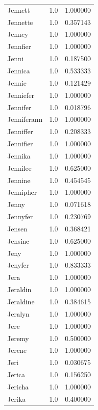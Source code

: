 \documentclass[
  letterpaper,
  DIV=11,
  numbers=noendperiod]{scrreprt}
\begin{document}
\begin{tabular}{lrr}
Jennett         &   1.0 &   1.000000 \\
Jennette        &   1.0 &   0.357143 \\
Jenney          &   1.0 &   1.000000 \\
Jennfier        &   1.0 &   1.000000 \\
Jenni           &   1.0 &   0.187500 \\
Jennica         &   1.0 &   0.533333 \\
Jennie          &   1.0 &   0.121429 \\
Jenniefer       &   1.0 &   1.000000 \\
Jennifer        &   1.0 &   0.018796 \\
Jenniferann     &   1.0 &   1.000000 \\
Jenniffer       &   1.0 &   0.208333 \\
Jennifier       &   1.0 &   1.000000 \\
Jennika         &   1.0 &   1.000000 \\
Jennilee        &   1.0 &   0.625000 \\
Jennine         &   1.0 &   0.454545 \\
Jennipher       &   1.0 &   1.000000 \\
Jenny           &   1.0 &   0.071618 \\
Jennyfer        &   1.0 &   0.230769 \\
Jensen          &   1.0 &   0.368421 \\
Jensine         &   1.0 &   0.625000 \\
Jeny            &   1.0 &   1.000000 \\
Jenyfer         &   1.0 &   0.833333 \\
Jera            &   1.0 &   1.000000 \\
Jeraldin        &   1.0 &   1.000000 \\
Jeraldine       &   1.0 &   0.384615 \\
Jeralyn         &   1.0 &   1.000000 \\
Jere            &   1.0 &   1.000000 \\
Jeremy          &   1.0 &   0.500000 \\
Jerene          &   1.0 &   1.000000 \\
Jeri            &   1.0 &   0.030675 \\
Jerica          &   1.0 &   0.156250 \\
Jericha         &   1.0 &   1.000000 \\
Jerika          &   1.0 &   0.400000 \\

\end{tabular}
\end{document}
